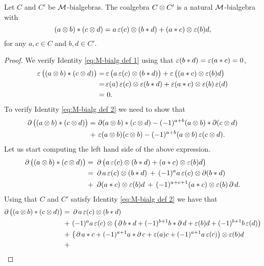 \begin{lemma}\label{l:monoidal M-bialg}
	Let $C$ and $C'$ be $\mathcal{M}$-bialgebras.
	The coalgebra $C \otimes C'$ is a natural $\mathcal{M}$-bialgebra with
	\begin{equation}\label{eq:monoidal_product}
		(a \otimes b) \ast (c \otimes d) =
		a \operatorname{\varepsilon}(c) \otimes (b \ast d) + (a \ast c) \otimes \operatorname{\varepsilon}(b) d,
	\end{equation}
	for any $a,c \in C$ and $b,d \in C'$.
\end{lemma}

\begin{proof}
	We verify Identity \eqref{eq:M-bialg def 1} using that $\operatorname{\varepsilon}(b \ast d) = \operatorname{\varepsilon}(a \ast c) = 0$,
	\begin{align*}
		\operatorname{\varepsilon}\big((a \otimes b) \ast (c \otimes d)\big) =&
		\operatorname{\varepsilon}\big(a \operatorname{\varepsilon}(c) \otimes (b \ast d)\big) + \operatorname{\varepsilon}\big((a \ast c) \otimes \operatorname{\varepsilon}(b) d\big) \\ =&
		\operatorname{\varepsilon}(a) \operatorname{\varepsilon}(c) \otimes \operatorname{\varepsilon}(b \ast d) + \operatorname{\varepsilon}(a \ast c) \otimes \operatorname{\varepsilon}(b) \operatorname{\varepsilon}(d) \\ =& \ 0.
	\end{align*}
	To verify Identity \eqref{eq:M-bialg def 2} we need to show that
	\begin{equation}\label{eq:monoidal appendix}
		\begin{split}
			\operatorname{\partial} \big((a \otimes b) \ast (c \otimes d)\big) =\, &
			\operatorname{\partial} (a \otimes b) \ast (c \otimes d) - (-1)^{a+b} (a \otimes b) \ast \operatorname{\partial} (c \otimes d) \\ +\, &
			\operatorname{\varepsilon}(a \otimes b) (c \otimes b) - (-1)^{a+b} (a \otimes b) \operatorname{\varepsilon}(c \otimes d).
		\end{split}
	\end{equation}
	Let us start computing the left hand side of the above expression.
	\begin{align*}
		\operatorname{\partial}\big((a \otimes b) \ast (c \otimes d)\big) =\ &
		\operatorname{\partial}\big(a \operatorname{\varepsilon}(c) \otimes (b \ast d) + (a \ast c) \otimes \operatorname{\varepsilon}(b) d\big) \\ =\ &
		\operatorname{\partial} a \operatorname{\varepsilon}(c) \otimes (b \ast d) \,+\, (-1)^{a} a \operatorname{\varepsilon}(c) \otimes \operatorname{\partial}(b \ast d) \\ +\ &
		\operatorname{\partial} (a \ast c) \otimes \operatorname{\varepsilon}(b) d \,+\, (-1)^{a+c+1} (a \ast c) \otimes \operatorname{\varepsilon}(b) \operatorname{\partial} d.
	\end{align*}
	Using that $C$ and $C'$ satisfy Identity \eqref{eq:M-bialg def 2} we have that
	\begin{align*}
		\bd\big((a \ot b) \ast (c \ot d)\big) =\ &
		\bd a \aug(c) \ot (b \ast d) \\ +\ &
		(-1)^a a \aug(c) \ot \big(\bd b \ast d + (-1)^{b+1} b \ast \bd d + \aug(b) d + (-1)^{b+1} b \aug(d)\big) \\ +\ &
		\big(\bd a \ast c + (-1)^{a+1} a \ast \bd c + \aug(a) c + (-1)^{a+1} a \aug(c)\big) \ot \aug(b) d \\ +\ &

\end{align*}
\end{proof}
